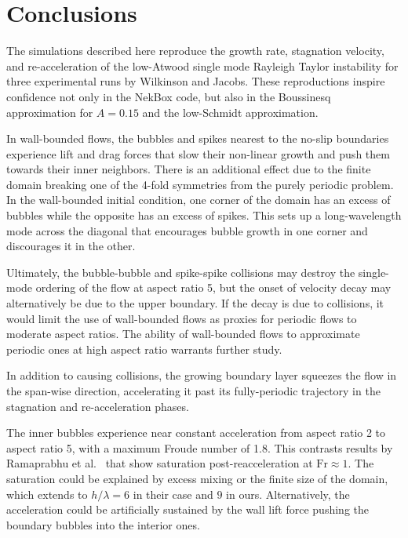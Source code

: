 \section{Conclusions} 

The simulations described here reproduce the growth rate, stagnation velocity, and re-acceleration of the low-Atwood single mode Rayleigh Taylor instability for three experimental runs by Wilkinson and Jacobs.
These reproductions inspire confidence not only in the NekBox code, but also in the Boussinesq approximation for $A = 0.15$ and the low-Schmidt approximation.

In wall-bounded flows, the bubbles and spikes nearest to the no-slip boundaries experience lift and drag forces that slow their non-linear growth and push them towards their inner neighbors.
There is an additional effect due to the finite domain breaking one of the 4-fold symmetries from the purely periodic problem.
In the wall-bounded initial condition, one corner of the domain has an excess of bubbles while the opposite has an excess of spikes.
This sets up a long-wavelength mode across the diagonal that encourages bubble growth in one corner and discourages it in the other.

Ultimately, the bubble-bubble and spike-spike collisions may destroy the single-mode ordering of the flow at aspect ratio 5, but the onset of velocity decay may alternatively be due to the upper boundary.
If the decay is due to collisions, it would limit the use of wall-bounded flows as proxies for periodic flows to moderate aspect ratios.
The ability of wall-bounded flows to approximate periodic ones at high aspect ratio warrants further study.

In addition to causing collisions, the growing boundary layer squeezes the flow in the span-wise direction, accelerating it past its fully-periodic trajectory in the stagnation and re-acceleration phases.

The inner bubbles experience near constant acceleration from aspect ratio 2 to aspect ratio 5, with a maximum Froude number of 1.8.
This contrasts results by Ramaprabhu et al.~\cite{Ramaprabhu2012} that show saturation post-reacceleration at $\text{Fr} \approx 1$.
The saturation could be explained by excess mixing or the finite size of the domain, which extends to $h/\lambda = 6$ in their case and $9$ in ours.
Alternatively, the acceleration could be artificially sustained by the wall lift force pushing the boundary bubbles into the interior ones.

